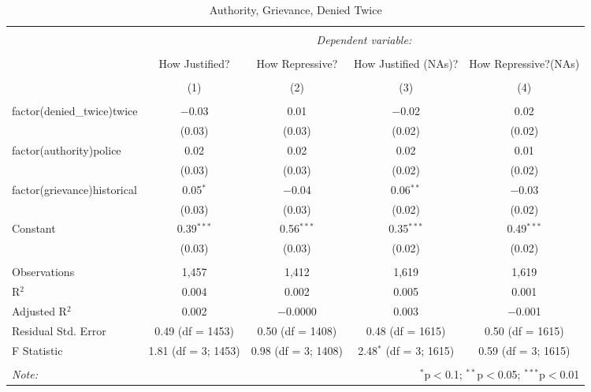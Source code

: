 
\begin{table}[!htbp] \centering 
  \caption{Authority, Grievance, Denied Twice} 
  \label{} 
\begin{tabular}{@{\extracolsep{5pt}}lcccc} 
\\[-1.8ex]\hline 
\hline \\[-1.8ex] 
 & \multicolumn{4}{c}{\textit{Dependent variable:}} \\ 
\cline{2-5} 
\\[-1.8ex] & How Justified? & How Repressive? & How Justified (NAs)? & How Repressive?(NAs) \\ 
\\[-1.8ex] & (1) & (2) & (3) & (4)\\ 
\hline \\[-1.8ex] 
 factor(denied\_twice)twice & $-$0.03 & 0.01 & $-$0.02 & 0.02 \\ 
  & (0.03) & (0.03) & (0.02) & (0.02) \\ 
  factor(authority)police & 0.02 & 0.02 & 0.02 & 0.01 \\ 
  & (0.03) & (0.03) & (0.02) & (0.02) \\ 
  factor(grievance)historical & 0.05$^{*}$ & $-$0.04 & 0.06$^{**}$ & $-$0.03 \\ 
  & (0.03) & (0.03) & (0.02) & (0.02) \\ 
  Constant & 0.39$^{***}$ & 0.56$^{***}$ & 0.35$^{***}$ & 0.49$^{***}$ \\ 
  & (0.03) & (0.03) & (0.02) & (0.02) \\ 
 \hline \\[-1.8ex] 
Observations & 1,457 & 1,412 & 1,619 & 1,619 \\ 
R$^{2}$ & 0.004 & 0.002 & 0.005 & 0.001 \\ 
Adjusted R$^{2}$ & 0.002 & $-$0.0000 & 0.003 & $-$0.001 \\ 
Residual Std. Error & 0.49 (df = 1453) & 0.50 (df = 1408) & 0.48 (df = 1615) & 0.50 (df = 1615) \\ 
F Statistic & 1.81 (df = 3; 1453) & 0.98 (df = 3; 1408) & 2.48$^{*}$ (df = 3; 1615) & 0.59 (df = 3; 1615) \\ 
\hline 
\hline \\[-1.8ex] 
\textit{Note:}  & \multicolumn{4}{r}{$^{*}$p$<$0.1; $^{**}$p$<$0.05; $^{***}$p$<$0.01} \\ 
\end{tabular} 
\end{table} 
